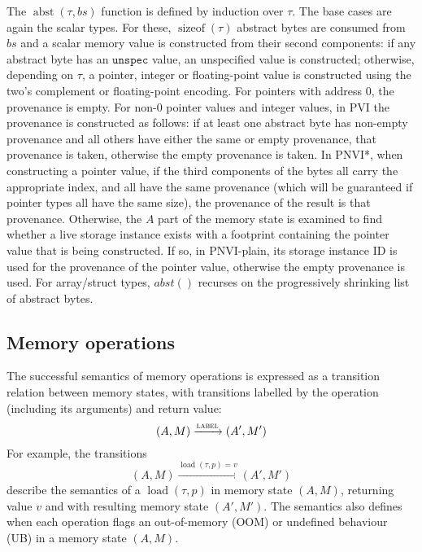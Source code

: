 \documentclass[acmsmall,review,screen]{acmart}\settopmatter{printfolios=true,printccs=false,printacmref=false}
\DeclareMathOperator{\load}{load}
\DeclareMathOperator{\sizeof}{sizeof}
\DeclareMathOperator{\abst}{abst}
\newcommand{\unspec}{\mathtt{unspec}}
\begin{document}
The $\abst(\tau, bs)$ function is defined by induction over
$\tau$. The base cases are again the scalar types. For these, $\sizeof(\tau)$
abstract bytes are consumed from $bs$ and a scalar memory value is
constructed from their second components: if any abstract byte has an
$\unspec$ value, an unspecified value is constructed; otherwise,
depending on $\tau$, a pointer, integer or floating-point value is
constructed using the two's complement or floating-point encoding.
%
For pointers with address $0$, the provenance is empty. For non-$0$ pointer
values and integer values, in PVI the provenance is constructed as
follows: if 
at least one abstract byte has non-empty provenance and all others
have either the same or empty provenance, 
that
provenance is taken, otherwise the empty provenance is taken.
In PNVI*, when constructing a pointer value, 
if the third components of the bytes all carry the appropriate
index, and all have the same provenance (which will be guaranteed if
pointer types all have the same size), the provenance of the result is that provenance. Otherwise, the $A$ part of the memory state is examined to find whether a live
storage instance exists with a footprint containing the pointer value that
is being constructed. If so, in PNVI-plain, its storage instance ID
is used for the provenance of the pointer value, otherwise the empty
provenance is used.
For array/struct types, $abst()$ recurses on %
the progressively shrinking list of abstract bytes.




\subsection{Memory operations}

The successful semantics of memory operations is expressed as a transition
relation between memory states, with transitions labelled by the
operation (including its arguments) and return value:
\[
(A,M)\xrightarrow{\textsc{label}} (A',M')
\]
For example, the transitions 
\[
(A,M) \xrightarrow{\load(\tau,p)=v} (A',M')
\]
describe the semantics of a $\load(\tau,p)$ in memory state $(A,M)$,
returning value $v$ and with resulting memory state $(A',M')$. 
%
The semantics also defines when each operation flags an out-of-memory
(OOM) or undefined behaviour (UB) in a memory state $(A,M)$. 
\end{document}
